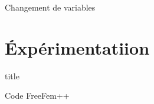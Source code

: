 \documentclass[french]{beamer}
\begin{document}
  \begin{frame}{Changement de variables} 
  \end{frame}

  \section{Éxpérimentatiion}
  \begin{frame}
    \vfill
    \centering
    \begin{beamercolorbox}[sep=8pt,center,shadow=true,rounded=true]{title}
      \insertsectionhead
    \end{beamercolorbox}
    \vfill
  \end{frame}


  \begin{frame}{Code FreeFem++}
  \end{frame}


  
\end{document}
